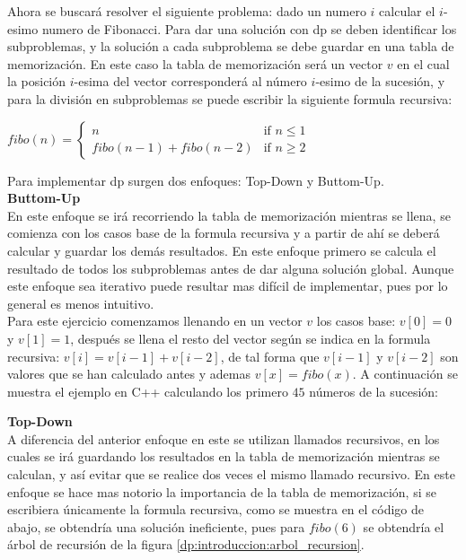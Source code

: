 \documentclass[12pt, a4paper]{article}
\newcommand\cppfile[2][]{

}
\begin{document}
	Ahora se buscará resolver el siguiente problema: dado un numero $i$ calcular el $i$-esimo numero de Fibonacci. 
	Para dar una solución con dp se deben identificar los subproblemas, y la solución a cada subproblema se debe  
	guardar en una tabla de memorización. En este caso la tabla de memorización será un vector $v$ en el cual la  
	posición $i$-esima del vector corresponderá al número $i$-esimo de la sucesión, y para la división en subproblemas  
	se puede escribir la siguiente formula recursiva:\\
	\begin{center}
		$fibo(n) = 	
			\begin{cases}
				n & \text{if $n\le 1$}\\
				fibo(n-1) + fibo(n-2) & \text{if $n\ge 2$}
		\end{cases}	$\\
	\end{center}
	
	Para implementar dp surgen dos enfoques: Top-Down y Buttom-Up.\\
	
	\textbf{Buttom-Up}\\
	En este enfoque se irá recorriendo la tabla de memorización mientras se llena, se comienza con los
	casos base de la formula recursiva y a partir de ahí se deberá calcular y guardar los demás resultados. En este  
	enfoque primero se calcula el resultado de todos los subproblemas antes de dar alguna solución global. Aunque   
	este enfoque sea iterativo puede resultar mas difícil de implementar, pues por lo general es menos intuitivo.\\
	
	Para este ejercicio comenzamos llenando en un vector $v$ los casos base: $v[0] = 0$ y  $v[1] = 1$, después 
	se llena el resto del vector según se indica en la formula recursiva: $v[i] = v[i-1] + v[i-2]$, de tal forma que  
	$v[i-1]$ y $v[i-2]$ son valores que se han calculado antes y ademas $v[x] = fibo(x)$. A continuación se muestra el  
	ejemplo en C++ calculando los primero $45$ números de la sucesión:
	\cppfile[7-12]{Programacion_dinamica/codigos/fibo.cpp}
	
	\textbf{Top-Down}\\
	A diferencia del anterior enfoque en este se utilizan llamados recursivos, en los cuales se irá guardando
	los resultados en la tabla de memorización mientras se calculan, y así evitar que se realice dos veces el
	mismo llamado recursivo. En este enfoque se hace mas notorio la importancia de la tabla de memorización, si se  
	escribiera únicamente la formula recursiva, como se muestra en el código de abajo, se obtendría una solución 
	ineficiente, pues para $fibo(6)$ se obtendría el árbol de recursión de la figura 
	\ref{dp:introduccion:arbol_recursion}.
	\cppfile[14-19]{Programacion_dinamica/codigos/fibo.cpp}
\end{document}
